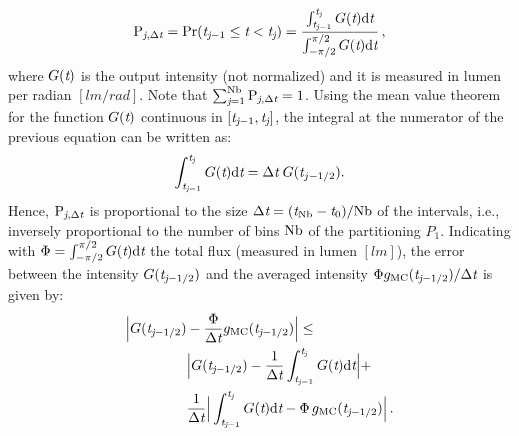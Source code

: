 \begin{equation}\label{eq:probability}
\textrm{P}_{\textit{j}, \Delta\textit{t}} = \Pr(\textit{t}_{\textit{j}-1}\leq\textit{t}<\textit{t}_{\textit{j}})= 
\frac{\int_{\textit{t}_{\textit{j}-1}}^{\textit{t}_{\textit{j}}} G(\textit{t}) \textrm{d}\textit{t}}{\int_{-\pi/2}^{\pi/2}G(\textit{t}) \textrm{d}\textit{t}}\,,
\end{equation}
where $G(\textit{t})$ is the output intensity (not normalized) and it is measured in lumen per radian $[lm/rad]$.
Note that $\sum_{\textit{j}=1}^{\textrm{Nb}}\textrm{P}_{\textit{j}, \Delta\textit{t}}=1$. Using the mean value theorem for the function 
$G(\textit{t})$ continuous in $[\textit{t}_{\textit{j}-1}, \textit{t}_{\textit{j}}]$, the integral at the numerator of the previous equation can be written as: \begin{equation}
\int_{\textit{t}_{\textit{j}-1}}^{\textit{t}_{\textit{j}}} G(\textit{t}) \textrm{d}\textit{t} = \Delta \textit{t}\;G(\textit{t}_{j-1/2}).
\end{equation}
Hence, $\textrm{P}_{\textit{j}, \Delta\textit{t}}$ is proportional to the size $\Delta\textit{t}= (\textit{t}_{\textrm{Nb}}-\textit{t}_{0})/{\textrm{Nb}}$ 
of the intervals, i.e., inversely proportional to the number of bins $\textrm{Nb}$ of the partitioning $P_1$.
Indicating with $\Phi = \int_{-\pi/2}^{\pi/2}G(\textit{t}) \textrm{d}\textit{t}$ the total flux (measured in lumen $[lm]$),
the error between the intensity $G(\textit{t}_{\textit{j}-1/2})$
 and the averaged  intensity $\Phi g_{\textrm{MC}}(\textit{t}_{\textit{j}-1/2})/\Delta\textit{t}$ is given by:
\begin{equation}\label{eq:error_int}
\begin{aligned}
\Big|G(\textit{t}_{\textit{j}-1/2})&-\frac{\Phi}
{\Delta\textit{t}}g_{\textrm{MC}}(\textit{t}_{\textit{j}-1/2})\Big| \leq\\
 &\Big|G(\textit{t}_{\textit{j}-1/2})-\frac{1}{\Delta \textit{t}}\int_{\textit{t}_{\textit{j}-1}}^{\textit{t}_{\textit{j}}} G(\textit{t})\textrm{d}\textit{t}\Big|+\\
&\frac{1}{\Delta \textit{t}}\Big|\int_{\textit{t}_{\textit{j}-1}}^{\textit{t}_{\textit{j}}} G(\textit{t})\textrm{d}\textit{t}-
\Phi\, g_{\textrm{MC}}(\textit{t}_{\textit{j}-1/2})\Big| \,.
\end{aligned}
\end{equation}
